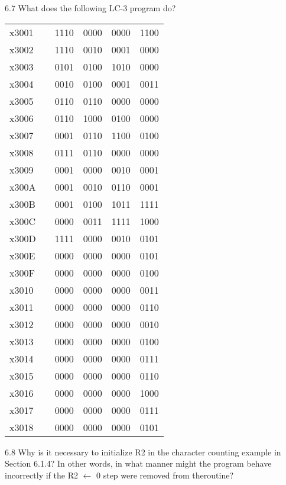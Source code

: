 \documentclass{patt}
\begin{document}
\begin{exercises}
\item[6.7] What does the following LC-3 program do?

\begin{inlinetable}
\ttfamily\color{seventyblack}
\vspace{-12pt}
\begin{longtable}{llllll}
x3001 &  & 1110 & 0000 & 0000 & 1100\\
x3002 &  & 1110 & 0010 & 0001 & 0000\\
x3003 &  & 0101 & 0100 & 1010 & 0000\\
x3004 &  & 0010 & 0100 & 0001 & 0011\\
x3005 &  & 0110 & 0110 & 0000 & 0000\\
x3006 &  & 0110 & 1000 & 0100 & 0000\\
x3007 &  & 0001 & 0110 & 1100 & 0100\\
x3008 &  & 0111 & 0110 & 0000 & 0000\\
x3009 &  & 0001 & 0000 & 0010 & 0001\\
x300A &  & 0001 & 0010 & 0110 & 0001\\
x300B &  & 0001 & 0100 & 1011 & 1111\\
x300C &  & 0000 & 0011 & 1111 & 1000\\
x300D &  & 1111 & 0000 & 0010 & 0101\\
x300E &  & 0000 & 0000 & 0000 & 0101\\
x300F &  & 0000 & 0000 & 0000 & 0100\\
x3010 &  & 0000 & 0000 & 0000 & 0011\\
x3011 &  & 0000 & 0000 & 0000 & 0110\\
x3012 &  & 0000 & 0000 & 0000 & 0010\\
x3013 &  & 0000 & 0000 & 0000 & 0100\\
x3014 &  & 0000 & 0000 & 0000 & 0111\\*
x3015 &  & 0000 & 0000 & 0000 & 0110\\*
x3016 &  & 0000 & 0000 & 0000 & 1000\\*
x3017 &  & 0000 & 0000 & 0000 & 0111\\*
x3018 &  & 0000 & 0000 & 0000 & 0101
\end{longtable}
\vspace{-10pt}
\end{inlinetable}

\item[6.8] Why is it necessary to initialize R2 in the character counting example\break
in Section 6.1.4?  In other words, in what manner might the program\break
behave incorrectly if the R2 $\leftarrow$ 0 step were removed
from the\break routine?


\end{exercises}
\end{document}
